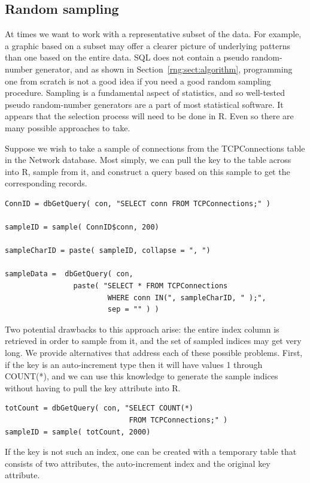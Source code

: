 \subsection{Random sampling}
At times we want to work with a representative subset of the data.
For example, a graphic based on a subset may offer a clearer picture of
underlying patterns than one based on the entire data. 
SQL does not contain a pseudo random-number generator, and as shown
in Section~\ref{rng:sect:algorithm}, programming one from scratch
is not a good idea if you need a good random sampling procedure.
Sampling is a fundamental aspect of statistics, and so
well-tested pseudo random-number generators are a part of most 
statistical software. 
It appears that the selection process will need to be done in R. 
Even so there are many possible approaches to take.

Suppose we wish to take a sample of connections from the TCPConnections
table in the Network database.
Most simply, we can pull the key to the table across into R,
sample from it, and construct a query based on this sample
to get the corresponding records.

\begin{verbatim}
ConnID = dbGetQuery( con, "SELECT conn FROM TCPConnections;" )

sampleID = sample( ConnID$conn, 200)

sampleCharID = paste( sampleID, collapse = ", ")

sampleData =  dbGetQuery( con, 
                paste( "SELECT * FROM TCPConnections 
                        WHERE conn IN(", sampleCharID, " );", 
                        sep = "" ) )
\end{verbatim}

Two potential drawbacks to this approach arise: 
the entire index column is retrieved in order to sample from it,
and the set of sampled indices may get very long.  
We provide alternatives that address each of these possible problems.
First, if the key is an auto-increment type then it will have
values 1 through COUNT(*), and we can use this knowledge to 
generate the sample indices without having to pull the key attribute
into R.
\begin{verbatim}
totCount = dbGetQuery( con, "SELECT COUNT(*) 
                             FROM TCPConnections;" )
sampleID = sample( totCount, 2000)
\end{verbatim}
If the key is not such an index, one can be created with a temporary
table that consists of two attributes, the auto-increment index
and the original key attribute. 

